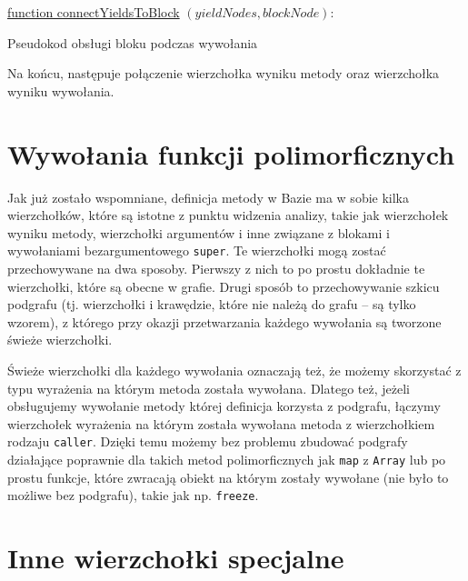 \documentclass[declaration,shortabstract,mgr]{iithesis}
\newcommand{\algsize}{\small}
\begin{document}
\begin{algorithm}
    \algsize
    \underline{function connectYieldsToBlock} $(\mathit{yieldNodes}, \mathit{blockNode})$:\\
    \caption{Pseudokod obsługi bloku podczas wywołania}
    \label{alg:blocks}
\end{algorithm}


Na końcu, następuje połączenie wierzchołka wyniku metody oraz wierzchołka wyniku wywołania.


\section{Wywołania funkcji polimorficznych}

Jak już zostało wspomniane, definicja metody w Bazie ma w sobie kilka wierzchołków, które są istotne z punktu widzenia analizy, takie jak wierzchołek wyniku metody, wierzchołki argumentów i inne związane z blokami i wywołaniami bezargumentowego \texttt{super}. Te wierzchołki mogą zostać przechowywane na dwa sposoby. Pierwszy z nich to po prostu dokładnie te wierzchołki, które są obecne w grafie. Drugi sposób to przechowywanie szkicu podgrafu (tj. wierzchołki i krawędzie, które nie należą do grafu -- są tylko wzorem), z którego przy okazji przetwarzania każdego wywołania są tworzone świeże wierzchołki.

Świeże wierzchołki dla każdego wywołania oznaczają też, że możemy skorzystać z typu wyrażenia na którym metoda została wywołana. Dlatego też, jeżeli obsługujemy wywołanie metody której definicja korzysta z podgrafu, łączymy wierzchołek wyrażenia na którym została wywołana metoda z wierzchołkiem rodzaju \texttt{caller}. Dzięki temu możemy bez problemu zbudować podgrafy działające poprawnie dla takich metod polimorficznych jak \texttt{map} z \texttt{Array} lub po prostu funkcje, które zwracają obiekt na którym zostały wywołane (nie było to możliwe bez podgrafu), takie jak np. \texttt{freeze}.

\section{Inne wierzchołki specjalne}
\end{document}
